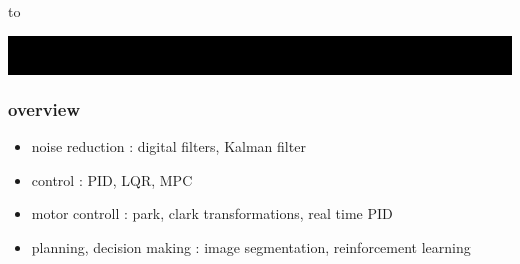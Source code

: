 \documentclass{beamer}
\begin{document}
{
    \usebackgroundtemplate
    {
        \vbox to 
    }

    \begin{frame}
     \centering
     \colorbox{black}
     {
        \begin{minipage}{8cm}
           {\LARGE \color{white}{\bf algorithms for robotics}} \\
           {\LARGE \color{white}{\bf Michal CHOVANEC, PhD.}} \\
       \end{minipage}
     }

    \end{frame}
}


\begin{frame}
  
  \frametitle{\bf overview}

  \begin{itemize}
    \item noise reduction             : digital filters, Kalman filter
    \item control                     : PID, LQR, MPC
    \item motor controll              : park, clark transformations, real time PID
    \item planning, decision making   : image segmentation, reinforcement learning
  \end{itemize}
    
\end{frame}
\end{document}
